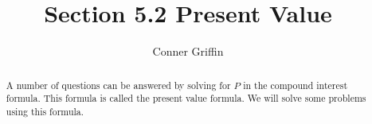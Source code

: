\documentclass{ximera}
\title{Section 5.2 Present Value}
\author{Conner Griffin}
\begin{document}
\begin{abstract}
    A number of questions can be answered by solving for \(P\) in the compound interest formula. This formula is called the present value formula. We will solve some problems using this formula.
\end{abstract}
\maketitle




\end{document}

